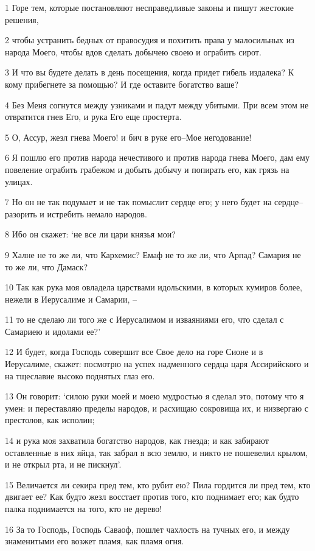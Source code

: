 \par 1 Горе тем, которые постановляют несправедливые законы и пишут жестокие решения,
\par 2 чтобы устранить бедных от правосудия и похитить права у малосильных из народа Моего, чтобы вдов сделать добычею своею и ограбить сирот.
\par 3 И что вы будете делать в день посещения, когда придет гибель издалека? К кому прибегнете за помощью? И где оставите богатство ваше?
\par 4 Без Меня согнутся между узниками и падут между убитыми. При всем этом не отвратится гнев Его, и рука Его еще простерта.
\par 5 О, Ассур, жезл гнева Моего! и бич в руке его--Мое негодование!
\par 6 Я пошлю его против народа нечестивого и против народа гнева Моего, дам ему повеление ограбить грабежом и добыть добычу и попирать его, как грязь на улицах.
\par 7 Но он не так подумает и не так помыслит сердце его; у него будет на сердце--разорить и истребить немало народов.
\par 8 Ибо он скажет: `не все ли цари князья мои?
\par 9 Халне не то же ли, что Кархемис? Емаф не то же ли, что Арпад? Самария не то же ли, что Дамаск?
\par 10 Так как рука моя овладела царствами идольскими, в которых кумиров более, нежели в Иерусалиме и Самарии, --
\par 11 то не сделаю ли того же с Иерусалимом и изваяниями его, что сделал с Самариею и идолами ее?'
\par 12 И будет, когда Господь совершит все Свое дело на горе Сионе и в Иерусалиме, скажет: посмотрю на успех надменного сердца царя Ассирийского и на тщеславие высоко поднятых глаз его.
\par 13 Он говорит: `силою руки моей и моею мудростью я сделал это, потому что я умен: и переставляю пределы народов, и расхищаю сокровища их, и низвергаю с престолов, как исполин;
\par 14 и рука моя захватила богатство народов, как гнезда; и как забирают оставленные в них яйца, так забрал я всю землю, и никто не пошевелил крылом, и не открыл рта, и не пискнул'.
\par 15 Величается ли секира пред тем, кто рубит ею? Пила гордится ли пред тем, кто двигает ее? Как будто жезл восстает против того, кто поднимает его; как будто палка поднимается на того, кто не дерево!
\par 16 За то Господь, Господь Саваоф, пошлет чахлость на тучных его, и между знаменитыми его возжет пламя, как пламя огня.
